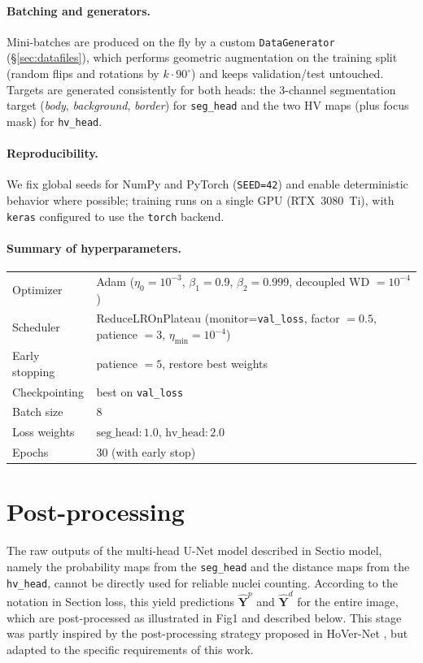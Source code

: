 \documentclass[target=bach,aauheader=,style=]{thud}
\begin{document}
\paragraph{Batching and generators.}
Mini-batches are produced on the fly by a custom \texttt{DataGenerator} (\S\ref{sec:datafiles}), which performs geometric augmentation on the training split (random flips and rotations by $k\cdot 90^\circ$) and keeps validation/test untouched. Targets are generated consistently for both heads: the 3-channel segmentation target (\emph{body}, \emph{background}, \emph{border}) for \texttt{seg\_head} and the two HV maps (plus focus mask) for \texttt{hv\_head}.

\paragraph{Reproducibility.}
We fix global seeds for NumPy and PyTorch (\texttt{SEED=42}) and enable deterministic behavior where possible; training runs on a single GPU (RTX~3080~Ti), with \texttt{keras} configured to use the \texttt{torch} backend.

\paragraph{Summary of hyperparameters.}
\begin{center}
\begin{tabular}{l l}
\hline
Optimizer & Adam ($\eta_0{=}10^{-3}$, $\beta_1{=}0.9$, $\beta_2{=}0.999$, decoupled WD $=10^{-4}$) \\
Scheduler & ReduceLROnPlateau (monitor=\texttt{val\_loss}, factor $=0.5$, patience $=3$, $\eta_{\min}{=}10^{-4}$) \\
Early stopping & patience $=5$, restore best weights \\
Checkpointing & best on \texttt{val\_loss} \\
Batch size & $8$ \\
Loss weights & $\text{seg\_head}:1.0$, $\text{hv\_head}:2.0$ \\
Epochs & $30$ (with early stop) \\
\hline
\end{tabular}
\end{center}
\section{Post-processing}

The raw outputs of the multi-head U-Net model described in Sectio model, namely the probability maps from the \texttt{seg\_head} and the distance maps from the \texttt{hv\_head}, cannot be directly used for reliable nuclei counting. 
According to the notation in Section loss, this yield predictions $\widehat{\mathbf{Y}}^p$ and $\widehat{\mathbf{Y}}^d$ for the entire image, which are post-processed as illustrated in Fig1 and described below. 
This stage was partly inspired by the post-processing strategy proposed in HoVer-Net \cite{graham2019hovernet}, but adapted to the specific requirements of this work.
\end{document}
